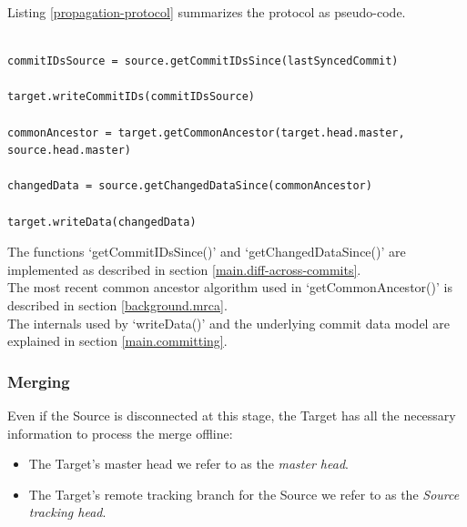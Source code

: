 Listing \ref{propagation-protocol} summarizes the protocol as pseudo-code.

\begin{lstlisting}[caption=Propagation Protocol, label=propagation-protocol]

commitIDsSource = source.getCommitIDsSince(lastSyncedCommit)

target.writeCommitIDs(commitIDsSource)

commonAncestor = target.getCommonAncestor(target.head.master, source.head.master)

changedData = source.getChangedDataSince(commonAncestor)

target.writeData(changedData)

\end{lstlisting}

The functions `getCommitIDsSince()' and `getChangedDataSince()' are implemented as described in section \ref{main.diff-across-commits}.\\
The most recent common ancestor algorithm used in `getCommonAncestor()' is described in section \ref{background.mrca}.\\
The internals used by `writeData()' and the underlying commit data model are explained in section \ref{main.committing}.

\subsubsection{Merging}
Even if the Source is disconnected at this stage, the Target has all the necessary information to process the merge offline:\\

\begin{itemize}
\item The Target's master head we refer to as the \emph{master head}.\\
\item The Target's remote tracking branch for the Source we refer to as the \emph{Source tracking head}.
\end{itemize}


